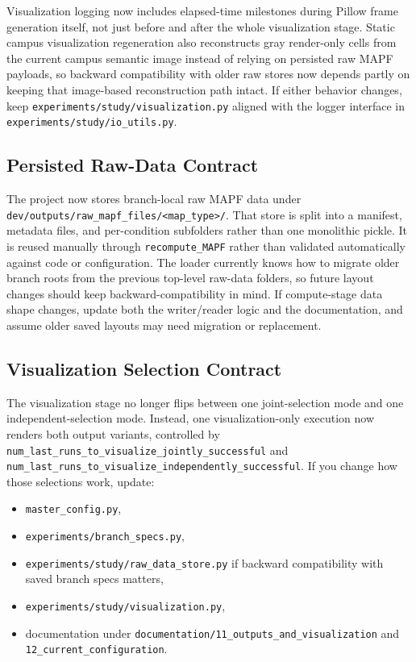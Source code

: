 \documentclass[11pt]{article}
\begin{document}
Visualization logging now includes elapsed-time milestones during Pillow frame generation itself, not just before and after the whole visualization stage. Static campus visualization regeneration also reconstructs gray render-only cells from the current campus semantic image instead of relying on persisted raw MAPF payloads, so backward compatibility with older raw stores now depends partly on keeping that image-based reconstruction path intact. If either behavior changes, keep \texttt{experiments/study/visualization.py} aligned with the logger interface in \texttt{experiments/study/io\_utils.py}.

\subsection{Persisted Raw-Data Contract}
The project now stores branch-local raw MAPF data under \texttt{dev/outputs/raw\_mapf\_files/<map\_type>/}. That store is split into a manifest, metadata files, and per-condition subfolders rather than one monolithic pickle. It is reused manually through \texttt{recompute\_MAPF} rather than validated automatically against code or configuration. The loader currently knows how to migrate older branch roots from the previous top-level raw-data folders, so future layout changes should keep backward-compatibility in mind. If compute-stage data shape changes, update both the writer/reader logic and the documentation, and assume older saved layouts may need migration or replacement.

\subsection{Visualization Selection Contract}
The visualization stage no longer flips between one joint-selection mode and one independent-selection mode. Instead, one visualization-only execution now renders both output variants, controlled by \texttt{num\_last\_runs\_to\_visualize\_jointly\_successful} and \texttt{num\_last\_runs\_to\_visualize\_independently\_successful}. If you change how those selections work, update:
\begin{itemize}[leftmargin=2em]
    \item \texttt{master\_config.py},
    \item \texttt{experiments/branch\_specs.py},
    \item \texttt{experiments/study/raw\_data\_store.py} if backward compatibility with saved branch specs matters,
    \item \texttt{experiments/study/visualization.py},
    \item documentation under \texttt{documentation/11\_outputs\_and\_visualization} and \texttt{12\_current\_configuration}.
\end{itemize}
\end{document}

